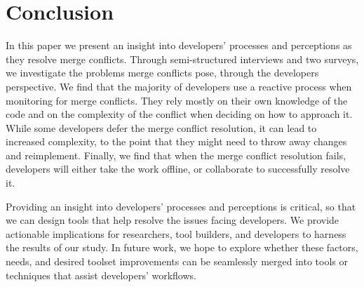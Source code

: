 \section{Conclusion}\label{conclusion}

In this paper we present an insight into developers' processes and perceptions as they resolve merge conflicts.
Through semi-structured interviews and two surveys, we investigate the problems merge conflicts pose, through the developers perspective.
We find that the majority of developers use a reactive process when monitoring for merge conflicts.
They rely mostly on their own knowledge of the code and on the complexity of the conflict when deciding on how to approach it.
While some developers defer the merge conflict resolution, it can lead to increased complexity, to the point that they might need to throw away changes and reimplement.
Finally, we find that when the merge conflict resolution fails, developers will either take the work offline, or collaborate to successfully resolve it. 

Providing an insight into developers' processes and perceptions is critical, so that we can design tools that help resolve the issues facing developers.
We provide actionable implications for researchers, tool builders, and developers to harness the results of our study.
In future work, we hope to explore whether these factors, needs, and desired toolset improvements can be seamlessly merged into tools or techniques that assist developers' workflows.

%
%
